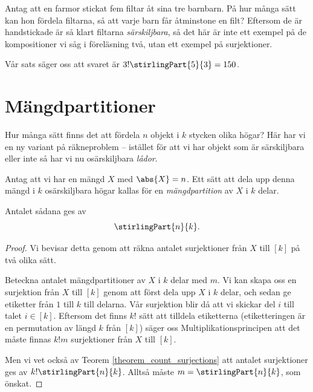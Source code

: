 \documentclass[nobib]{tufte-handout}
\begin{document}
\begin{example}
  Antag att en farmor stickat fem filtar åt sina tre barnbarn.  På hur många sätt kan hon fördela filtarna, så att varje barn får åtminstone en filt? Eftersom de är handstickade är så klart filtarna \emph{särskiljbara}, så det här är inte ett exempel på de kompositioner vi såg i föreläsning två, utan ett exempel på surjektioner.

  Vår sats säger oss att svaret är $3!\stirlingPart{5}{3} = 150$.
\end{example}

\section{Mängdpartitioner}

Hur många sätt finns det att fördela $n$ objekt i $k$ stycken olika högar? Här har vi en ny variant på räkneproblem -- istället för att vi har objekt som är särskiljbara eller inte så har vi nu osärskiljbara \emph{lådor}.

\begin{theorem}
  Antag att vi har en mängd $X$ med $\abs{X} = n$. Ett sätt att dela upp denna mängd i $k$ osärskiljbara högar  kallas för en \emph{mängdpartition} av $X$ i $k$ delar.

  Antalet sådana ges av
  $$\stirlingPart{n}{k}.$$

  \begin{proof}
    Vi bevisar detta genom att räkna antalet surjektioner från $X$ till $[k]$ på två olika sätt.

    Beteckna antalet mängdpartitioner av $X$ i $k$ delar med $m$. Vi kan skapa oss en surjektion från $X$ till $[k]$ genom att först dela upp $X$ i $k$ delar, och sedan ge etiketter från $1$ till $k$ till delarna. Vår surjektion blir då att vi skickar del $i$ till talet $i \in [k]$. Eftersom det finns $k!$ sätt att tilldela etiketterna (etiketteringen är en permutation av längd $k$ från $[k]$) säger oss Multiplikationsprincipen att det måste finnas $k!m$ surjektioner från $X$ till $[k]$.

    Men vi vet också av Teorem \ref{theorem_count_surjections} att antalet surjektioner ges av $k!\stirlingPart{n}{k}$. Alltså måste $m = \stirlingPart{n}{k}$, som önskat.
  \end{proof}
\end{theorem}
\end{document}
